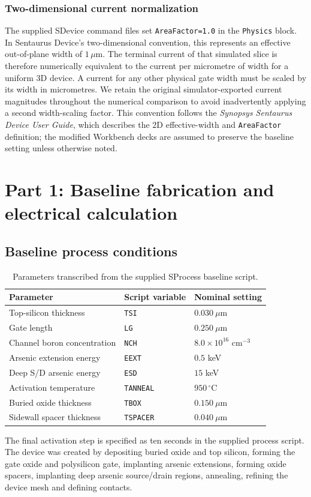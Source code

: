 \documentclass[11pt,a4paper]{article}
\begin{document}
\subsubsection*{Two-dimensional current normalization}
The supplied SDevice command files set
\texttt{AreaFactor=1.0} in the \texttt{Physics} block.
In Sentaurus Device's two-dimensional convention, this
represents an effective out-of-plane width of $1\,\mu$m.
The terminal current of that simulated slice is therefore
numerically equivalent to the current per micrometre of width
for a uniform 3D device. A current for any other physical
gate width must be scaled by its width in micrometres.
We retain the original simulator-exported current magnitudes
throughout the numerical comparison to avoid inadvertently
applying a second width-scaling factor. This convention follows
the \emph{Synopsys Sentaurus Device User Guide},
which describes the 2D effective-width and
\texttt{AreaFactor} definition; the modified Workbench
decks are assumed to preserve the baseline setting
unless otherwise noted.

\section{Part 1: Baseline fabrication and electrical calculation}
\subsection{Baseline process conditions}
\begin{table}[H]\centering
\caption{Parameters transcribed from the supplied SProcess baseline script.}
\begin{tabular}{@{}lll@{}}\toprule
Parameter & Script variable & Nominal setting\\\midrule
Top-silicon thickness & \texttt{TSI} & $0.030~\mu$m\\
Gate length & \texttt{LG} & $0.250~\mu$m\\
Channel boron concentration & \texttt{NCH} & $8.0\times10^{16}$ cm$^{-3}$\\
Arsenic extension energy & \texttt{EEXT} & $0.5$ keV\\
Deep S/D arsenic energy & \texttt{ESD} & $15$ keV\\
Activation temperature & \texttt{TANNEAL} & $950\,^\circ$C\\
Buried oxide thickness & \texttt{TBOX} & $0.150~\mu$m\\
Sidewall spacer thickness & \texttt{TSPACER} & $0.040~\mu$m\\
\bottomrule\end{tabular}
\end{table}
The final activation step is specified as ten seconds in the supplied process script. The device was created by depositing buried oxide and top silicon, forming the gate oxide and polysilicon gate, implanting arsenic extensions, forming oxide spacers, implanting deep arsenic source/drain regions, annealing, refining the device mesh and defining contacts.
\end{document}
